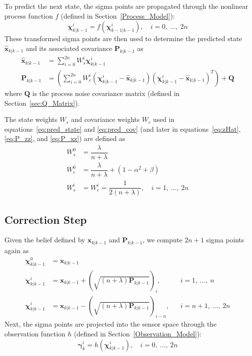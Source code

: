 To predict the next state, the sigma points are propagated through the nonlinear process function $f$ (defined in Section~\ref{Process_Model}):
%
\begin{equation}
\bm{\chi}^{i}_{k | k-1} = f \left( \bm{\chi}^{i}_{k-1 | k-1} \right), \quad i = 0,\ \dots,\ 2n
\end{equation}
%
These transformed sigma points are then used to determine the predicted state $\hat{\mathbf{x}}_{k | k-1}$ and its associated covariance $\mathbf{P}_{k | k-1}$ as
%
\begin{align}
\hat{\mathbf{x}}_{k | k-1} &= \sum^{2n}_{i=0} W^{i}_{s} \bm{\chi}^{i}_{k | k-1} \label{eq:pred_state} \\
\mathbf{P}_{k | k-1} &= \left( \sum^{2n}_{i=0} W^{i}_{c} \left( \bm{\chi}^{i}_{k | k-1} - \hat{\mathbf{x}}_{k | k-1} \right) \left( \bm{\chi}^{i}_{k | k-1} - \hat{\mathbf{x}}_{k | k-1} \right)^{T} \right) + \mathbf{Q}  \label{eq:pred_cov}
\end{align}
%
where $\mathbf{Q}$ is the process noise covariance matrix (defined in Section~\ref{sec:Q_Matrix}).

The state weights $W_{s}$ and covariance weights $W_{c}$ used in equations~\ref{eq:pred_state} and \ref{eq:pred_cov} (and later in equations~\ref{eq:zHat}, \ref{eq:P_zz}, and \ref{eq:P_xz}) are defined as
%
\begin{align}
W^{0}_{s} &= \dfrac{\lambda}{n + \lambda} \nonumber \\
W^{0}_{c} &= \dfrac{\lambda}{n + \lambda} + \left( 1 - \alpha^{2} + \beta \right) \\
W^{i}_{s} &= W^{i}_{c} = \dfrac{1}{2 \left(n + \lambda \right)}, \quad i = 1,\ \dots,\ 2n \nonumber
\end{align}

\subsection{Correction Step}

Given the belief defined by $\mathbf{x}_{k | k-1}$ and $\mathbf{P}_{k | k-1}$, we compute $2n + 1$ sigma points again as
%
\begin{align}
\bm{\chi}^{0}_{k | k-1} &= \mathbf{x}_{k | k-1} & \nonumber\\
\bm{\chi}^{i}_{k | k-1} &= \mathbf{x}_{k | k-1} + \left( \sqrt{\left( n + \lambda \right) \mathbf{P}_{k | k-1}} \right)_{i}, &&i = 1,\ \dots,\ n \\
\bm{\chi}^{i}_{k | k-1} &= \mathbf{x}_{k | k-1} - \left( \sqrt{\left( n + \lambda \right) \mathbf{P}_{k | k-1}} \right)_{i-n}, &&i = n+1,\ \dots,\ 2n \nonumber
\end{align}
%
Next, the sigma points are projected into the sensor space through the observation function $h$ (defined in Section~\ref{Observation_Model}):
%
\begin{equation}
\bm{\gamma}^{i}_{k} = h \left( \bm{\chi}^{i}_{k | k-1} \right), \quad i = 0,\ \dots,\ 2n
\end{equation}

